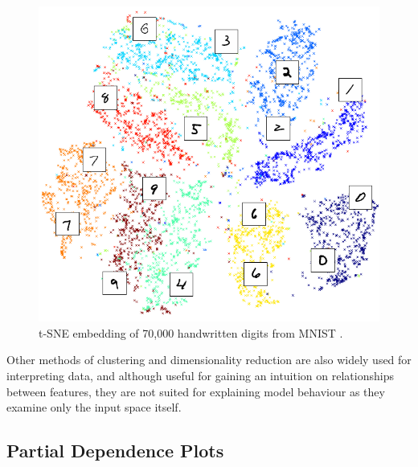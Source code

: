 \documentclass[main]{subfiles}
\begin{document}
\begin{figure}[h]
\centering
\includegraphics[scale=0.2]{tsne.png}
\caption{t-SNE embedding of 70,000 handwritten digits from MNIST \cite{tsne}.}
\label{tsneimg}
\end{figure}

Other methods of clustering and dimensionality reduction are also widely used for interpreting data, and although useful for gaining an intuition on relationships between features, they are not suited for explaining model behaviour as they examine only the input space itself. 

\subsection{Partial Dependence Plots}
\end{document}
